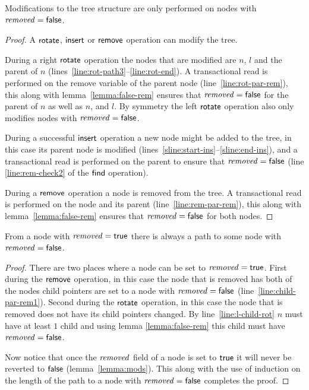 \begin{lemma}
\label{lemma:mods}
Modifications to the tree structure are only performed on nodes with $\ms{removed}=\lit{false}$.
\end{lemma}
\begin{proof}
A $\act{rotate}$, $\act{insert}$ or $\act{remove}$ operation can modify the tree.

During a right $\act{rotate}$ operation the nodes that are modified are $n$, $l$ and the parent of $n$ (lines~\ref{line:rot-path3}--\ref{line:rot-end}).
A transactional read is performed on the remove variable of the parent node (line~\ref{line:rot-par-rem}), this along with lemma~\ref{lemma:false-rem} ensures 
that $\ms{removed}=\lit{false}$ for the parent of $n$ as well as $n$, and $l$.
By symmetry the left $\act{rotate}$ operation also only modifies nodes with $\ms{removed}=\lit{false}$.

During a successful $\act{insert}$ operation a new node might be added to the tree, in this case its parent node is modified (lines~\ref{sline:start-ins}--\ref{sline:end-ins}), and
a transactional read is performed on the parent to ensure that $\ms{removed}=\lit{false}$ (line \ref{line:rem-check2} of the $\act{find}$ operation).

During a $\act{remove}$ operation a node is removed from the tree.
A transactional read is performed on the node and its parent (line~\ref{line:rem-par-rem}), this along with lemma~\ref{lemma:false-rem} ensures that $\ms{removed}=\lit{false}$ for both nodes.
\end{proof}

\begin{lemma}
\label{lemma:path-false}
From a node with $\ms{removed}=\lit{true}$ there is always a path to some node with $\ms{removed}=\lit{false}$.
\end{lemma}
\begin{proof}
There are two places where a node can be set to $\ms{removed}=\lit{true}$.
First during the $\act{remove}$ operation, in this case the node that is removed has both of the nodes child pointers are set to a node
with $\ms{removed}=\lit{false}$ (line~\ref{line:child-par-rem1}).%
Second during the $\act{rotate}$ operation, in this case the node that is removed does not have its child pointers changed.
By line~\ref{line:l-child-rot} $n$ must have at least $1$ child and using lemma \ref{lemma:false-rem} this child must have $\ms{removed}=\lit{false}$.

Now notice that once the $\ms{removed}$ field of a node is set to $\lit{true}$ it will never be reverted to $\lit{false}$ (lemma~\ref{lemma:mods}).
This along with the use of induction on the length
of the path to a node with $\ms{removed}=\lit{false}$ completes the proof.
\end{proof}


